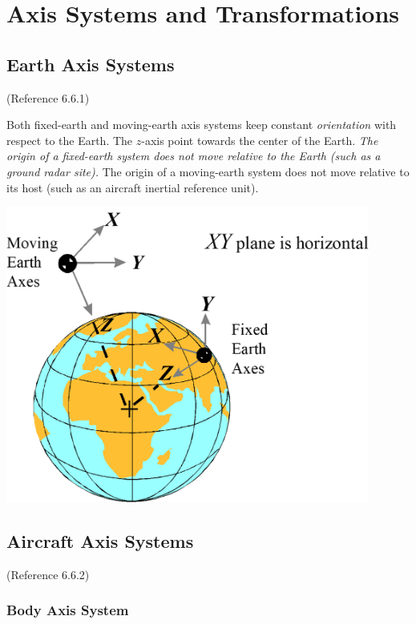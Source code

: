 \documentclass[
]{book}
\begin{document}
\hypertarget{axis-systems-and-transformations}{%
\chapter{Axis Systems and Transformations}\label{axis-systems-and-transformations}}

\hypertarget{earth-axis-systems}{%
\section{Earth Axis Systems}\label{earth-axis-systems}}

(Reference 6.6.1)

Both fixed-earth and moving-earth axis systems keep constant \emph{orientation} with respect to the Earth. The \(z\)-axis point towards the center of the Earth.
\emph{The origin of a fixed-earth system does not move relative to the Earth (such as a ground radar site).
}The origin of a moving-earth system does not move relative to its host (such as an aircraft inertial reference unit).

\includegraphics[width=4.70903in,height=3.83958in]{media/06/image1.png}

\hypertarget{aircraft-axis-systems}{%
\section{Aircraft Axis Systems}\label{aircraft-axis-systems}}

(Reference 6.6.2)

\hypertarget{body-axis-system}{%
\subsection{Body Axis System}\label{body-axis-system}}
\end{document}
